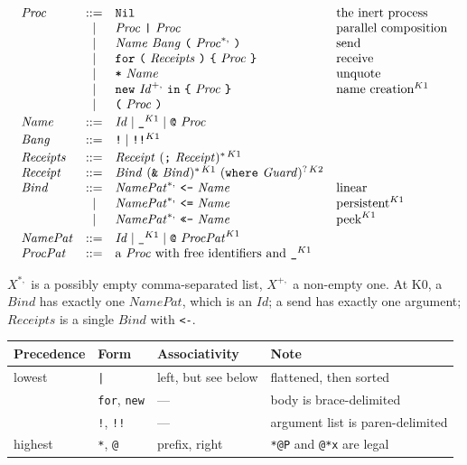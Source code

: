 \documentclass[11pt,a4paper]{article}
\newcommand{\code}[1]{\texttt{#1}}
\theoremstyle{definition}
\theoremstyle{plain}
\begin{document}
\[
\begin{array}{lcll}
\mathit{Proc} &::=& \code{Nil} & \text{the inert process}\\
 &\mid& \mathit{Proc}\ \code{|}\ \mathit{Proc} & \text{parallel composition}\\
 &\mid& \mathit{Name}\ \mathit{Bang}\ \code{(}\ \mathit{Proc}^{*,}\ \code{)} & \text{send}\\
 &\mid& \code{for}\ \code{(}\ \mathit{Receipts}\ \code{)}\ \code{\{}\ \mathit{Proc}\ \code{\}} & \text{receive}\\
 &\mid& \code{*}\ \mathit{Name} & \text{unquote}\\
 &\mid& \code{new}\ \mathit{Id}^{+,}\ \code{in}\ \code{\{}\ \mathit{Proc}\ \code{\}} & \text{name creation}^{K1}\\
 &\mid& \code{(}\ \mathit{Proc}\ \code{)} &\\[2pt]
\mathit{Name} &::=& \mathit{Id} \mid \code{\_}^{K1} \mid \code{@}\ \mathit{Proc} &\\[2pt]
\mathit{Bang} &::=& \code{!} \mid \code{!!}^{K1} &\\[2pt]
\mathit{Receipts} &::=& \mathit{Receipt}\ (\code{;}\ \mathit{Receipt})^{*\,K1} &\\
\mathit{Receipt} &::=& \mathit{Bind}\ (\code{\&}\ \mathit{Bind})^{*\,K1}\ (\code{where}\ \mathit{Guard})^{?\,K2} &\\
\mathit{Bind} &::=& \mathit{NamePat}^{*,}\ \code{<-}\ \mathit{Name} & \text{linear}\\
 &\mid& \mathit{NamePat}^{*,}\ \code{<=}\ \mathit{Name} & \text{persistent}^{K1}\\
 &\mid& \mathit{NamePat}^{*,}\ \code{<<-}\ \mathit{Name} & \text{peek}^{K1}\\[2pt]
\mathit{NamePat} &::=& \mathit{Id} \mid \code{\_}^{K1} \mid \code{@}\ \mathit{ProcPat}^{K1} &\\
\mathit{ProcPat} &::=& \text{a \emph{Proc} with free identifiers and }\code{\_}^{K1} &
\end{array}
\]

\noindent
$X^{*,}$ is a possibly empty comma-separated list, $X^{+,}$ a non-empty one.
At K0, a $\mathit{Bind}$ has exactly one $\mathit{NamePat}$, which is an
$\mathit{Id}$; a send has exactly one argument; $\mathit{Receipts}$ is a single
$\mathit{Bind}$ with \code{<-}.

\begin{center}
\begin{tabular}{@{}llll@{}}
\toprule
Precedence & Form & Associativity & Note\\
\midrule
lowest & \code{|} & left, but see below & flattened, then sorted\\
 & \code{for}, \code{new} & --- & body is brace-delimited\\
 & \code{!}, \code{!!} & --- & argument list is paren-delimited\\
highest & \code{*}, \code{@} & prefix, right & \code{*@P} and \code{@*x} are legal\\
\bottomrule
\end{tabular}
\end{center}
\end{document}
